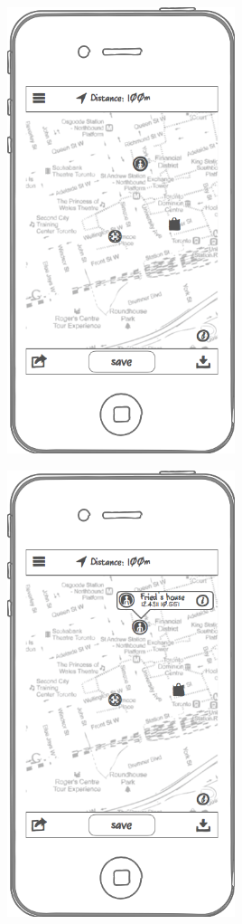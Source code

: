\documentclass[thesis=M,english]{FITthesis}[2012/10/20]
\begin{document}
\begin{center}
\includegraphics[width=0.5\textwidth]{images/wireframes/main_screen}

\includegraphics[width=0.5\textwidth]{images/wireframes/main_screen_detail}


\end{center}
\end{document}
